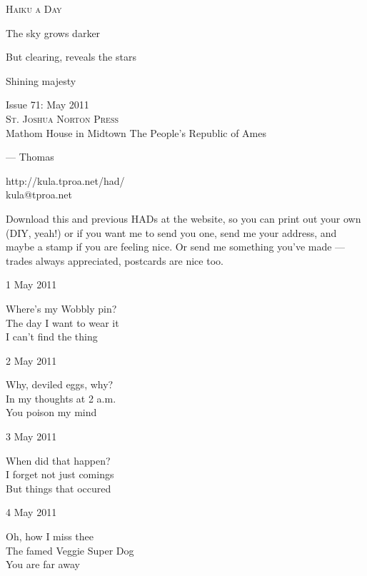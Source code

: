 \documentclass[12pt]{article}
\begin{document}
\begin{center}
{\fontsize{36}{48}\selectfont \textsc{Haiku a Day }}
\end{center}

\vspace*{3.5cm}

{\fontsize{20}{40}\selectfont 


The sky grows darker

But clearing, reveals the stars

Shining majesty


}

\vspace*{5.0cm}
\begin{center}
{\large{Issue 71: May 2011}} \\[5mm]
{\fontsize{8}{8}\selectfont  \textsc{ St. Joshua Norton Press }} \\[1mm]
{\fontsize{6}{6}\selectfont Mathom House in Midtown \textbar The People's Republic of Ames }
\end{center}


\newpage

--- Thomas

http://kula.tproa.net/had/ \\
kula@tproa.net

Download this and previous HADs at the website, so you can
print out your own (DIY, yeah!) or if you want me to send
you one, send me your address, and maybe a stamp if you
are feeling nice. Or send me something you've made ---
trades always appreciated, postcards are nice too.

\vfill

1 May 2011

Where's my Wobbly pin? \\
The day I want to wear it \\
I can't find the thing

2 May 2011

Why, deviled eggs, why? \\
In my thoughts at 2 a.m. \\
You poison my mind

\newpage

3 May 2011

When did that happen? \\
I forget not just comings \\
But things that occured

4 May 2011

Oh, how I miss thee \\
The famed Veggie Super Dog \\
You are far away
\end{document}
